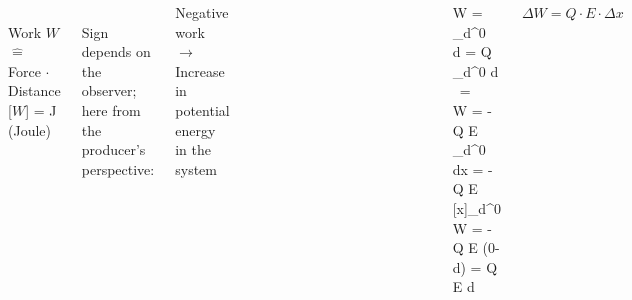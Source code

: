\begin{frame}
{\begin{columns}
		\phantom{.}\\
		
		Work $W$ $\widehat{=}$ Force $\cdot$ Distance\\

		[$W$] = J (Joule)

		
		\phantom{.}\\

		Sign depends on the observer; here from the producer's perspective:
		
		Negative work $\rightarrow$ Increase in potential energy in the system





	\begin{columns}



	\begin{figure}[h!]
		\centering
		
	\end{figure}




	\begin{figure}[h!]
		\centering
		
	\end{figure}


		
		\end{columns}		

		\pause





		\begin{eqa}
			W = \int_{d}^{0}   \, d  =  Q \int_{d}^{0}  \cdot d \\
			 \,  = \\
			 W = -Q \cdot E \int_{d}^{0} dx = -Q \cdot E \, [x]_d^0 \\
			 W = -Q \cdot E (0-d) = Q \cdot E \cdot d
		\end{eqa}


		\begin{Key point}{}
			$\Delta W = Q \cdot E \cdot \Delta x$
		\end{Key point}


\end{columns}}
\end{frame}
